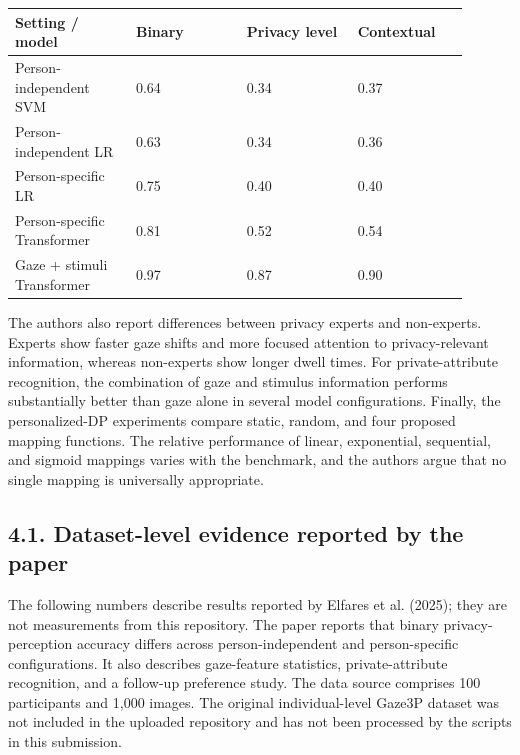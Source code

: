 \documentclass[11pt,a4paper]{article}
\begin{document}
\par\vspace{3pt}
{\footnotesize\begin{longtable}{@{}p{0.24\linewidth} p{0.22\linewidth} p{0.22\linewidth} p{0.22\linewidth}@{}}
\toprule
\textbf{Setting / model} & \textbf{Binary} & \textbf{Privacy level} & \textbf{Contextual} \\
\midrule
Person-independent SVM & 0.64 & 0.34 & 0.37 \\
Person-independent LR & 0.63 & 0.34 & 0.36 \\
Person-specific LR & 0.75 & 0.40 & 0.40 \\
Person-specific Transformer & 0.81 & 0.52 & 0.54 \\
Gaze + stimuli Transformer & 0.97 & 0.87 & 0.90 \\
\bottomrule\end{longtable}}
The authors also report differences between privacy experts and non-experts. Experts show faster gaze shifts and more focused attention to privacy-relevant information, whereas non-experts show longer dwell times. For private-attribute recognition, the combination of gaze and stimulus information performs substantially better than gaze alone in several model configurations. Finally, the personalized-DP experiments compare static, random, and four proposed mapping functions. The relative performance of linear, exponential, sequential, and sigmoid mappings varies with the benchmark, and the authors argue that no single mapping is universally appropriate.


\subsection*{4.1. Dataset-level evidence reported by the paper}

The following numbers describe results reported by Elfares et al. (2025); they are not measurements from this repository. The paper reports that binary privacy-perception accuracy differs across person-independent and person-specific configurations. It also describes gaze-feature statistics, private-attribute recognition, and a follow-up preference study. The data source comprises 100 participants and 1,000 images. The original individual-level Gaze3P dataset was not included in the uploaded repository and has not been processed by the scripts in this submission.
\end{document}
